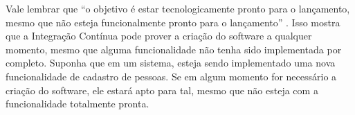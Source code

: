 Vale lembrar que ``o objetivo é estar tecnologicamente pronto para o lançamento, mesmo que não esteja funcionalmente pronto para o lançamento'' \cite{SHORE}. Isso mostra que a Integração Contínua pode prover a criação do software a qualquer momento, mesmo que alguma funcionalidade não tenha sido implementada por completo. Suponha que em um sistema, esteja sendo implementado uma nova funcionalidade de cadastro de pessoas. Se em algum momento for necessário a criação do software, ele estará apto para tal, mesmo que não esteja com a funcionalidade totalmente pronta.

